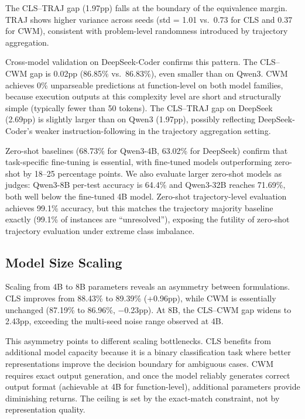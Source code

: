 \documentclass[11pt,a4paper]{article}
\begin{document}
The CLS--TRAJ gap (1.97pp) falls at the boundary of the equivalence margin. TRAJ shows higher variance across seeds (std = 1.01 vs.\ 0.73 for CLS and 0.37 for CWM), consistent with problem-level randomness introduced by trajectory aggregation.

Cross-model validation on DeepSeek-Coder confirms this pattern. The CLS--CWM gap is 0.02pp (86.85\% vs.\ 86.83\%), even smaller than on Qwen3. CWM achieves 0\% unparseable predictions at function-level on both model families, because execution outputs at this complexity level are short and structurally simple (typically fewer than 50 tokens). The CLS--TRAJ gap on DeepSeek (2.69pp) is slightly larger than on Qwen3 (1.97pp), possibly reflecting DeepSeek-Coder's weaker instruction-following in the trajectory aggregation setting.

Zero-shot baselines (68.73\% for Qwen3-4B, 63.02\% for DeepSeek) confirm that task-specific fine-tuning is essential, with fine-tuned models outperforming zero-shot by 18--25 percentage points. We also evaluate larger zero-shot models as judges: Qwen3-8B per-test accuracy is 64.4\% and Qwen3-32B reaches 71.69\%, both well below the fine-tuned 4B model. Zero-shot trajectory-level evaluation achieves 99.1\% accuracy, but this matches the trajectory majority baseline exactly (99.1\% of instances are ``unresolved''), exposing the futility of zero-shot trajectory evaluation under extreme class imbalance.

\subsection{Model Size Scaling}
\label{sec:scale}

Scaling from 4B to 8B parameters reveals an asymmetry between formulations. CLS improves from 88.43\% to 89.39\% (+0.96pp), while CWM is essentially unchanged (87.19\% to 86.96\%, $-$0.23pp). At 8B, the CLS--CWM gap widens to 2.43pp, exceeding the multi-seed noise range observed at 4B.

This asymmetry points to different scaling bottlenecks. CLS benefits from additional model capacity because it is a binary classification task where better representations improve the decision boundary for ambiguous cases. CWM requires exact output generation, and once the model reliably generates correct output format (achievable at 4B for function-level), additional parameters provide diminishing returns. The ceiling is set by the exact-match constraint, not by representation quality.
\end{document}
